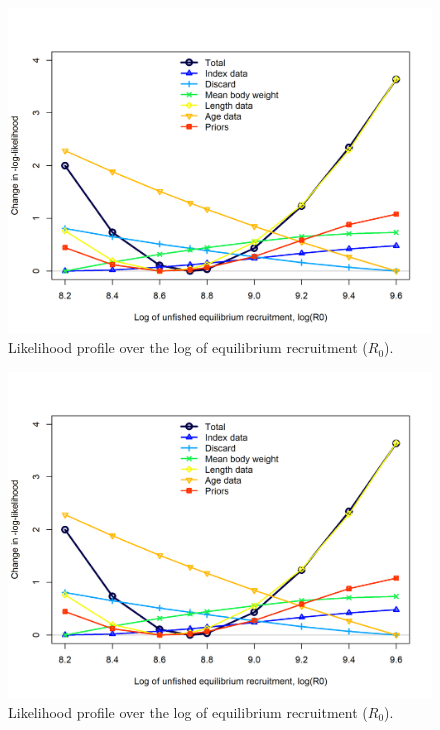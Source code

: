 \documentclass[12pt,]{article}
\begin{document}
\FloatBarrier

\begin{figure}[H]
\begin{centering}
\includegraphics{Figures/profile_logR0.png}
\caption{Likelihood profile over the log of equilibrium recruitment ($R_0$).}\label{fig:profile_logR0}
\end{centering}
\end{figure}

\newpage

\begin{figure}
\centering
\includegraphics{Figures/profile_logR0.png}
\caption{Likelihood profile over the log of equilibrium recruitment
(\(R_0\)).\label{fig:profile_logR0}}
\end{figure}
\end{document}
